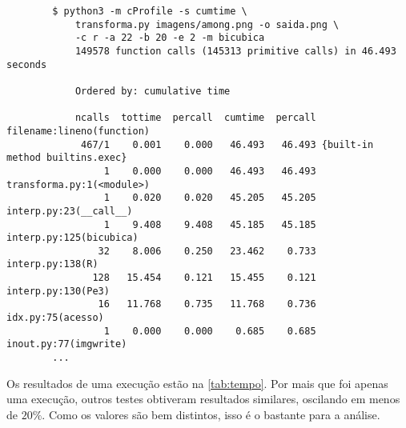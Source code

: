     \begin{verbatim}
        $ python3 -m cProfile -s cumtime \
            transforma.py imagens/among.png -o saida.png \
            -c r -a 22 -b 20 -e 2 -m bicubica
            149578 function calls (145313 primitive calls) in 46.493 seconds

            Ordered by: cumulative time

            ncalls  tottime  percall  cumtime  percall filename:lineno(function)
             467/1    0.001    0.000   46.493   46.493 {built-in method builtins.exec}
                 1    0.000    0.000   46.493   46.493 transforma.py:1(<module>)
                 1    0.020    0.020   45.205   45.205 interp.py:23(__call__)
                 1    9.408    9.408   45.185   45.185 interp.py:125(bicubica)
                32    8.006    0.250   23.462    0.733 interp.py:138(R)
               128   15.454    0.121   15.455    0.121 interp.py:130(Pe3)
                16   11.768    0.735   11.768    0.736 idx.py:75(acesso)
                 1    0.000    0.000    0.685    0.685 inout.py:77(imgwrite)
        ...
    \end{verbatim}

    Os resultados de uma execução estão na \cref{tab:tempo}. Por mais que foi apenas uma execução, outros testes obtiveram resultados similares, oscilando em menos de $20\%$. Como os valores são bem distintos, isso é o bastante para a análise.

    
